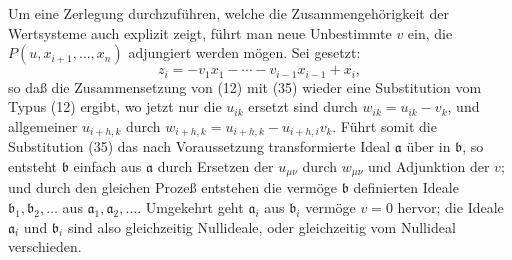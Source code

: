 \documentclass[11pt]{article}
\providecommand{\aideal}{\mathfrak a}
\providecommand{\bideal}{\mathfrak b}
\begin{document}
Um eine Zerlegung durchzuführen, welche die Zusammengehörigkeit der Wertsysteme auch explizit zeigt, führt man neue Unbestimmte $v$ ein, die $P(u,x_{i+1},\ldots,x_n)$ adjungiert werden mögen. Sei gesetzt:
\begin{equation}
 z_i=-v_1x_1-\cdots-v_{i-1}x_{i-1}+x_i,
\tag{35}
\end{equation}
so daß die Zusammensetzung von (12) mit (35) wieder eine Substitution vom Typus (12) ergibt, wo jetzt nur die $u_{ik}$ ersetzt sind durch $w_{ik}=u_{ik}-v_k$, und allgemeiner $u_{i+h,k}$ durch $w_{i+h,k}=u_{i+h,k}-u_{i+h,i}v_k$. Führt somit die Substitution (35) das nach Voraussetzung transformierte Ideal $\aideal$ über in $\bideal$, so entsteht $\bideal$ einfach aus $\aideal$ durch Ersetzen der $u_{\mu\nu}$ durch $w_{\mu\nu}$ und Adjunktion der $v$; und durch den gleichen Prozeß entstehen die vermöge $\bideal$ definierten Ideale $\bideal_1,\bideal_2,\ldots$ aus $\aideal_1,\aideal_2,\ldots$. Umgekehrt geht $\aideal_i$ aus $\bideal_i$ vermöge $v=0$ hervor; die Ideale $\aideal_i$ und $\bideal_i$ sind also gleichzeitig Nullideale, oder gleichzeitig vom Nullideal verschieden.
\end{document}
